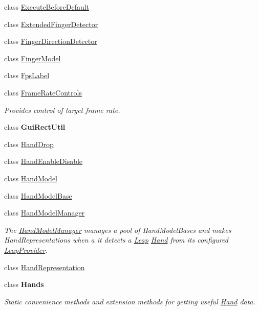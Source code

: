 \begin{DoxyCompactItemize}
class \mbox{\hyperlink{class_leap_1_1_unity_1_1_execute_before_default}{Execute\+Before\+Default}}
\item 
class \mbox{\hyperlink{class_leap_1_1_unity_1_1_extended_finger_detector}{Extended\+Finger\+Detector}}
\item 
class \mbox{\hyperlink{class_leap_1_1_unity_1_1_finger_direction_detector}{Finger\+Direction\+Detector}}
\item 
class \mbox{\hyperlink{class_leap_1_1_unity_1_1_finger_model}{Finger\+Model}}
\item 
class \mbox{\hyperlink{class_leap_1_1_unity_1_1_fps_label}{Fps\+Label}}
\item 
class \mbox{\hyperlink{class_leap_1_1_unity_1_1_frame_rate_controls}{Frame\+Rate\+Controls}}
\begin{DoxyCompactList}\small\item\em Provides control of target frame rate. \end{DoxyCompactList}\item 
class {\bfseries Gui\+Rect\+Util}
\item 
class \mbox{\hyperlink{class_leap_1_1_unity_1_1_hand_drop}{Hand\+Drop}}
\item 
class \mbox{\hyperlink{class_leap_1_1_unity_1_1_hand_enable_disable}{Hand\+Enable\+Disable}}
\item 
class \mbox{\hyperlink{class_leap_1_1_unity_1_1_hand_model}{Hand\+Model}}
\item 
class \mbox{\hyperlink{class_leap_1_1_unity_1_1_hand_model_base}{Hand\+Model\+Base}}
\item 
class \mbox{\hyperlink{class_leap_1_1_unity_1_1_hand_model_manager}{Hand\+Model\+Manager}}
\begin{DoxyCompactList}\small\item\em The \mbox{\hyperlink{class_leap_1_1_unity_1_1_hand_model_manager}{Hand\+Model\+Manager}} manages a pool of Hand\+Model\+Bases and makes Hand\+Representations when a it detects a \mbox{\hyperlink{namespace_leap_1_1_unity_1_1_leap}{Leap}} \mbox{\hyperlink{class_leap_1_1_hand}{Hand}} from its configured \mbox{\hyperlink{class_leap_1_1_unity_1_1_leap_provider}{Leap\+Provider}}. \end{DoxyCompactList}\item 
class \mbox{\hyperlink{class_leap_1_1_unity_1_1_hand_representation}{Hand\+Representation}}
\item 
class {\bfseries Hands}
\begin{DoxyCompactList}\small\item\em Static convenience methods and extension methods for getting useful \mbox{\hyperlink{class_leap_1_1_hand}{Hand}} data. \end{DoxyCompactList}\item 

\end{DoxyCompactItemize}
